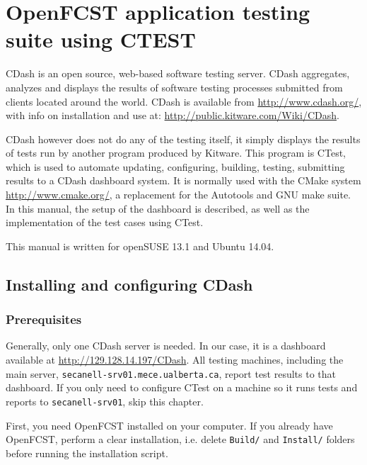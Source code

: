 \chapter{OpenFCST application testing suite using CTEST} \label{sec:CTest}


CDash is an open source, web-based software testing server. CDash aggregates, analyzes and displays the results of software testing processes submitted from clients located around the world. CDash is available from \url{http://www.cdash.org/}, with info on installation and use at: \url{http://public.kitware.com/Wiki/CDash}. 

CDash however does not do any of the testing itself, it simply displays the results of tests run by another program produced by Kitware. This program is CTest, which is used to automate updating, configuring, building, testing, submitting results to a CDash dashboard system. It is normally used with the CMake system \url{http://www.cmake.org/}, a replacement for the Autotools and GNU make suite. In this manual, the setup of the dashboard is described, as well as the implementation of the test cases using CTest. 

This manual is written for openSUSE 13.1 and Ubuntu 14.04.

\section{Installing and configuring CDash}

\subsection{Prerequisites}\label{sec:Prerequisites}

Generally, only one CDash server is needed. In our case, it is a dashboard available at \url{http://129.128.14.197/CDash}. All testing machines, including the main server, \verb!secanell-srv01.mece.ualberta.ca!, report test results to that dashboard. If you only need to configure CTest on a machine so it runs tests and reports to \verb!secanell-srv01!, skip this chapter.

First, you need OpenFCST installed on your computer. If you already have OpenFCST, perform a clear installation, i.e. delete \verb!Build/! and \verb!Install/! folders before running the installation script.

